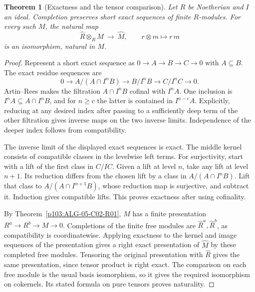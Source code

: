 \documentclass[11pt,oneside,openany]{book}
\newtheorem{theorem}{Theorem}[chapter]
\theoremstyle{definition}
\theoremstyle{remark}
\begin{document}
\begin{theorem}[Exactness and the tensor comparison]\label{p103:ALG-05-C04-R03}
Let \(R\) be Noetherian and \(I\) an ideal. Completion preserves short exact sequences of finite \(R\)-modules. For every such \(M\), the natural map
\[
 \widehat R\otimes_R M\ \longrightarrow\ \widehat M,\qquad
 r\otimes m\longmapsto r\,\widehat m
\]
is an isomorphism, natural in \(M\).
\end{theorem}
\begin{proof}
Represent a short exact sequence as \(0\to A\to B\to C\to0\) with \(A\subseteq B\). The exact residue sequences are
\[
 0\to A/(A\cap I^nB)\to B/I^nB\to C/I^nC\to0.
\]
Artin--Rees makes the filtration \(A\cap I^nB\) cofinal with \(I^nA\). One inclusion is \(I^nA\subseteq A\cap I^nB\), and for \(n\ge c\) the latter is contained in \(I^{n-c}A\). Explicitly, reducing at any desired index after passing to a sufficiently deep term of the other filtration gives inverse maps on the two inverse limits. Independence of the deeper index follows from compatibility.

The inverse limit of the displayed exact sequences is exact. The middle kernel consists of compatible classes in the levelwise left terms. For surjectivity, start with a lift of the first class in \(C/IC\). Given a lift at level \(n\), take any lift at level \(n+1\). Its reduction differs from the chosen lift by a class in \(A/(A\cap I^nB)\). Lift that class to \(A/(A\cap I^{n+1}B)\), whose reduction map is surjective, and subtract it. Induction gives compatible lifts. This proves exactness after using cofinality.

By Theorem~\ref{p103:ALG-05-C02-R01}, \(M\) has a finite presentation \(R^a\to R^b\to M\to0\). Completions of the finite free modules are \(\widehat R^a,\widehat R^b\), as compatibility is coordinatewise. Applying exactness to the kernel and image sequences of the presentation gives a right exact presentation of \(\widehat M\) by these completed free modules. Tensoring the original presentation with \(\widehat R\) gives the same presentation, since tensor product is right exact. The comparison on each free module is the usual basis isomorphism, so it gives the required isomorphism on cokernels. Its stated formula on pure tensors proves naturality.
\end{proof}
\end{document}
